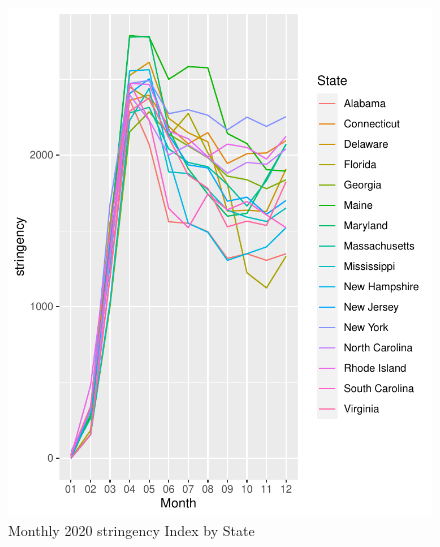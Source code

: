 \documentclass[10pt,letterpaper]{article}
\begin{document}
\begin{figure}

{\centering \includegraphics{C19PolicyRec_files/figure-latex/pString-1} 

}

\caption{Monthly 2020 stringency Index by State}\label{fig:pString}
\end{figure}
\end{document}
